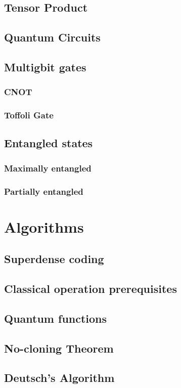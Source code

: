 \documentclass{article}
\begin{document}
\subsection{Tensor Product}
\subsection{Quantum Circuits}
\subsection{Multigbit gates}
\subsubsection{CNOT}
\subsubsection{Toffoli Gate}
\subsection{Entangled states}
\subsubsection{Maximally entangled}
\subsubsection{Partially entangled}

\section{Algorithms}
\subsection{Superdense coding}
\subsection{Classical operation prerequisites}
\subsection{Quantum functions}
\subsection{No-cloning Theorem}
\subsection{Deutsch's Algorithm}
\end{document}
